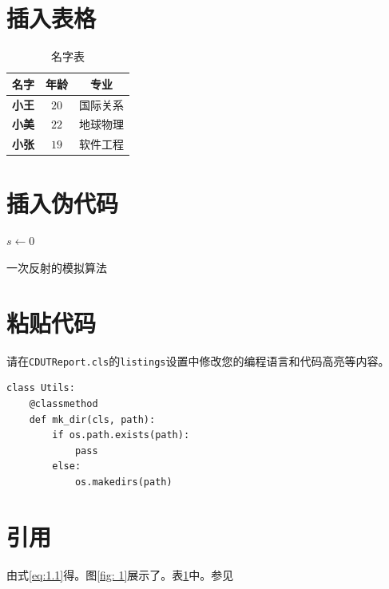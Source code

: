 \section{插入表格} 

\begin{table}[H]
    \centering
    \caption{名字表}
    \label{table: 1}
    \begin{tabular}{ccc}
        \hline
        名字 & 年龄 & 专业 \\
        \hline
        \textbf{小王} & $20$ & 国际关系 \\
        \textbf{小美} & $22$ & 地球物理\\
        \textbf{小张} & $19$ & 软件工程 \\
        \hline
    \end{tabular}
\end{table}

\section{插入伪代码}

\begin{spacing}{1.0}  %
    \begin{algorithm}[H]
        \SetAlgoLined
        $s \leftarrow 0$ \;
        \caption{一次反射的模拟算法}
    \end{algorithm}
\end{spacing}

\section{粘贴代码}
请在\texttt{CDUTReport.cls}的\texttt{listings}设置中修改您的编程语言和代码高亮等内容。
\begin{spacing}{1.0}
\begin{lstlisting}
class Utils:
    @classmethod
    def mk_dir(cls, path):
        if os.path.exists(path):
            pass
        else:
            os.makedirs(path)
\end{lstlisting}
\end{spacing}

\section{引用}
由式\ref{eq:1.1}得。图\ref{fig: 1}展示了。表\ref{table: 1}中。参见\cite{Landou}